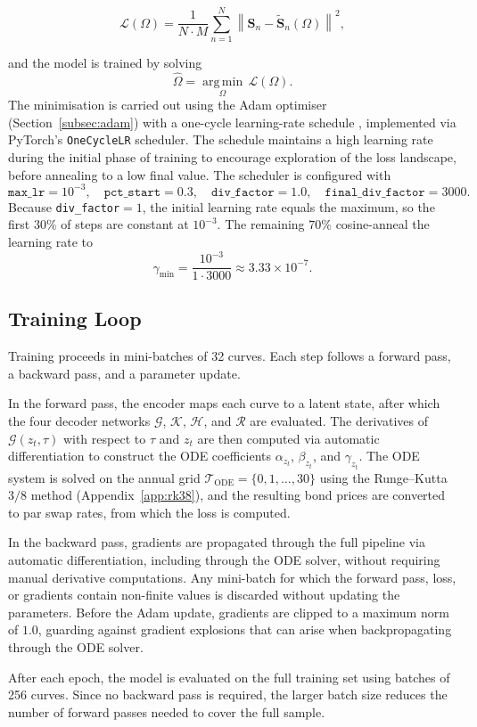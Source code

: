 \begin{equation}
\mathcal{L}(\Omega) = \frac{1}{N\cdot M } \sum_{n=1}^{N} 
\left\| \mathbf{S}_n - \widetilde{\mathbf{S}}_n(\Omega) 
\right\|^2,
\label{eq:model_estimation_loss}
\end{equation}

and the model is trained by solving
\begin{equation}
\widehat{\Omega}
=
\operatorname*{arg\,min}_{\Omega}\,\mathcal{L}(\Omega).
\label{eq:model_estimator}
\end{equation}
The minimisation is carried out using the Adam optimiser (Section~\ref{subsec:adam}) with a one-cycle learning-rate schedule \citep{smith2018superconvergence}, implemented via PyTorch's \texttt{OneCycleLR} scheduler.
The schedule maintains a high learning rate during the initial phase of training to encourage exploration of the loss landscape, before annealing to a low final value. The scheduler is configured with
\[
\texttt{max\_lr}=10^{-3},\quad
\texttt{pct\_start}=0.3,\quad
\texttt{div\_factor}=1.0,\quad
\texttt{final\_div\_factor}=3000.
\]
Because \texttt{div\_factor}$=1$, the initial learning rate equals the maximum,
so the first \(30\%\) of steps are constant at \(10^{-3}\). The remaining
\(70\%\) cosine-anneal the learning rate to
\[
\gamma_{\min}
=
\frac{10^{-3}}{1 \cdot3000}
\approx 3.33 \times 10^{-7}.
\]


\subsection{Training Loop}

Training proceeds in mini-batches of 32 curves. Each step follows a forward pass, a backward pass, and a parameter update.

In the forward pass, the encoder maps each curve to a latent state, after which the four decoder networks $\mathcal{G}$, $\mathcal{K}$, $\mathcal{H}$, and $\mathcal{R}$ are evaluated. The derivatives of $\mathcal{G}(z_t,\tau)$ with respect to $\tau$ and $z_t$ are then computed via automatic differentiation to construct the ODE coefficients $\alpha_{z_t}$, $\beta_{z_t}$, and $\gamma_{z_t}$. The ODE system is solved on the annual grid $\mathcal{T}_{\mathrm{ODE}}=\{0,1,\ldots,30\}$ using the Runge--Kutta $3/8$ method (Appendix~\ref{app:rk38}), and the resulting bond prices are converted to par swap rates, from which the loss is computed.

In the backward pass, gradients are propagated through the full pipeline via automatic differentiation, including through the ODE solver, without requiring manual derivative computations. Any mini-batch for which the forward pass, loss, or gradients contain non-finite values is discarded without updating the parameters. Before the Adam update, gradients are clipped to a maximum norm of $1.0$, guarding against gradient explosions that can arise when backpropagating through the ODE solver.


After each epoch, the model is evaluated on the full training set using batches of 256 curves. Since no backward pass is required, the larger batch size reduces the number of forward passes needed to cover the full sample.







